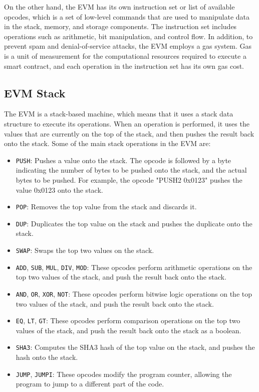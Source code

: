 On the other hand, the EVM has its own instruction set or list of available opcodes, which is a set of low-level commands that are used to manipulate data in the stack, memory, and storage components. The instruction set includes operations such as arithmetic, bit manipulation, and control flow.
In addition, to prevent spam and denial-of-service attacks, the EVM employs a gas system.
Gas is a unit of measurement for the computational resources required to execute a smart contract, and each operation in the instruction set has its own gas cost. 


\subsection{EVM Stack}

The EVM is a stack-based machine, which means that it uses a stack data structure to execute its operations.
When an operation is performed, it uses the values that are currently on the top of the stack, and then pushes the result back onto the stack.
Some of the main stack operations in the EVM are:

\begin{itemize}
    \item \texttt{PUSH}: Pushes a value onto the stack. The opcode is followed by a byte indicating the number of bytes to be pushed onto the stack, and the actual bytes to be pushed. For example, the opcode "PUSH2 0x0123" pushes the value 0x0123 onto the stack.
    \item \texttt{POP}: Removes the top value from the stack and discards it.
    \item \texttt{DUP}: Duplicates the top value on the stack and pushes the duplicate onto the stack.
    \item \texttt{SWAP}: Swaps the top two values on the stack.
    \item \texttt{ADD}, \texttt{SUB}, \texttt{MUL}, \texttt{DIV}, \texttt{MOD}: These opcodes perform arithmetic operations on the top two values of the stack, and push the result back onto the stack.
    \item \texttt{AND}, \texttt{OR}, \texttt{XOR}, \texttt{NOT}: These opcodes perform bitwise logic operations on the top two values of the stack, and push the result back onto the stack.
    \item \texttt{EQ}, \texttt{LT}, \texttt{GT}: These opcodes perform comparison operations on the top two values of the stack, and push the result back onto the stack as a boolean.
    \item \texttt{SHA3}: Computes the SHA3 hash of the top value on the stack, and pushes the hash onto the stack.
    \item \texttt{JUMP}, \texttt{JUMPI}: These opcodes modify the program counter, allowing the program to jump to a different part of the code.
\end{itemize}

